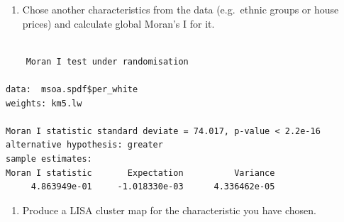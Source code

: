 \documentclass[
  letterpaper,
]{scrbook}
\newenvironment{Shaded}{\begin{snugshade}}{\end{snugshade}}
\newcommand{\AttributeTok}[1]{\textcolor[rgb]{0.40,0.45,0.13}{#1}}
\newcommand{\CommentTok}[1]{\textcolor[rgb]{0.37,0.37,0.37}{#1}}
\newcommand{\FunctionTok}[1]{\textcolor[rgb]{0.28,0.35,0.67}{#1}}
\newcommand{\NormalTok}[1]{\textcolor[rgb]{0.00,0.23,0.31}{#1}}
\newcommand{\SpecialCharTok}[1]{\textcolor[rgb]{0.37,0.37,0.37}{#1}}
\providecommand{\tightlist}{%
  \setlength{\itemsep}{0pt}\setlength{\parskip}{0pt}}\usepackage{longtable,booktabs,array}
\begin{document}
\begin{enumerate}
\def\labelenumi{\arabic{enumi}.}
\setcounter{enumi}{1}
\tightlist
\item
  Chose another characteristics from the data (e.g.~ethnic groups or
  house prices) and calculate global Moran's I for it.
\end{enumerate}

\begin{Shaded}
\end{Shaded}

\begin{verbatim}

    Moran I test under randomisation

data:  msoa.spdf$per_white  
weights: km5.lw    

Moran I statistic standard deviate = 74.017, p-value < 2.2e-16
alternative hypothesis: greater
sample estimates:
Moran I statistic       Expectation          Variance 
     4.863949e-01     -1.018330e-03      4.336462e-05 
\end{verbatim}

\begin{enumerate}
\def\labelenumi{\arabic{enumi}.}
\setcounter{enumi}{2}
\tightlist
\item
  Produce a LISA cluster map for the characteristic you have chosen.
\end{enumerate}
\end{document}
